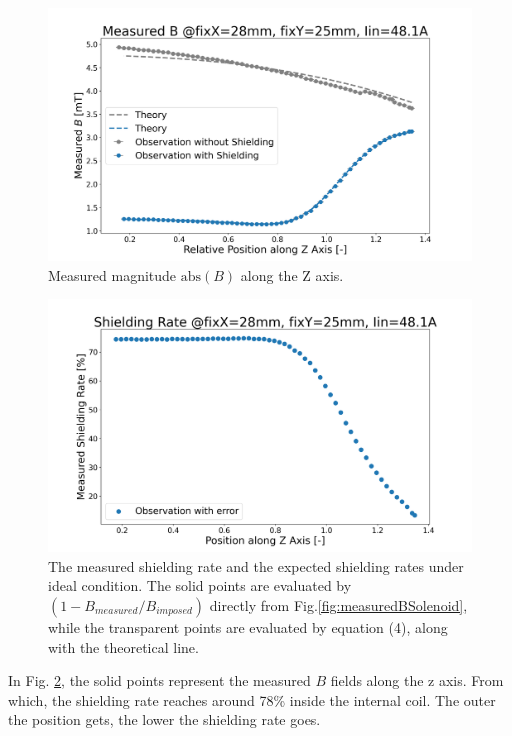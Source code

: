 \begin{figure}[H]
  \includegraphics[width=17cm, bb=9 9 900 520]{./section3Effectiveness/measuredBsSolenoid.png}
  \caption{Measured magnitude $\mathrm{abs}(B)$ along the Z axis.}
  \label{fig:shieldingAbilityMeasuredBs}
\end{figure}
\begin{figure}[H]
  \includegraphics[width=17cm, bb=9 9 900 480]{./section3Effectiveness/measuredShieldingRatesSolenoid.png}
  \caption{The measured shielding rate and the expected shielding rates under ideal condition. The solid points are evaluated by $(1-B_{measured}/B_{imposed})$ directly from Fig.\ref{fig:measuredBSolenoid}, while the transparent points are evaluated by equation (4), along with the theoretical line.}
  \label{fig:shieldingAbilityMeasuredShieldingRates}
\end{figure}
In Fig. \ref{fig:shieldingAbilityMeasuredShieldingRates},
the solid points represent the measured $B$ fields along the z axis.
From which, the shielding rate reaches around 78\% inside the internal coil.
The outer the position gets, the lower the shielding rate goes.

